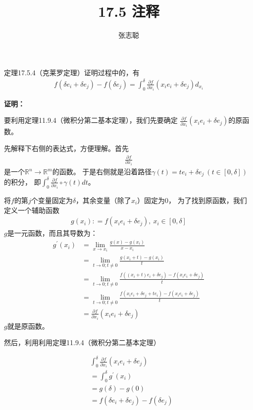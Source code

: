 \documentclass{article}
\begin{document}
\title{17.5 注释}
\author{张志聪}
\maketitle

\begin{zremark}
  定理17.5.4（克莱罗定理）证明过程中的，有
  \begin{align*}
    f(\delta e_i + \delta e_j) - f(\delta e_j)
    = \int_{0}^{\delta} \frac{\partial f}{\partial x_i} (x_ie_i + \delta e_j) d_{x_i}
  \end{align*}
\end{zremark}

\textbf{证明：}

要利用定理11.9.4（微积分第二基本定理），我们先要确定
$\frac{\partial f}{\partial x_i} (x_ie_i + \delta e_j)$的原函数。

先解释下右侧的表达式，方便理解。首先
\begin{align*}
  \frac{\partial f}{\partial x_i}
\end{align*}
是一个$\mathbb{R}^n \to \mathbb{R}^m$的函数。
于是右侧就是沿着路径$\gamma (t) = te_i + \delta e_j \ (t \in [0, \delta])$的积分，
即$\int_{0}^{\delta} \frac{\partial f}{\partial x_i} \circ \gamma (t) dt$。

将$f$的第$j$个变量固定为$\delta$，其余变量（除了$x_i$）固定为$0$，
为了找到原函数，我们定义一个辅助函数
\begin{align*}
  g(x_i) : = f(x_ie_i + \delta e_j), \ x_i \in [0, \delta]
\end{align*}
$g$是一元函数，而且其导数为：
\begin{align*}
  g^\prime(x_i)
   & = \lim \limits_{x \to x_i} \frac{g(x) - g(x_i)}{x - x_i}                                           \\
   & = \lim\limits_{t \to 0;t \neq 0} \frac{g(x_i + t) - g(x_i)}{t}                                     \\
   & = \lim\limits_{t \to 0;t \neq 0} \frac{f((x_i + t)e_i + \delta e_j) - f(x_ie_i + \delta e_j)}{t}   \\
   & = \lim\limits_{t \to 0;t \neq 0} \frac{f(x_i e_i + \delta e_j + te_i) - f(x_ie_i + \delta e_j)}{t} \\
   & = \frac{\partial f}{\partial x_i} (x_i e_i + \delta e_j)
\end{align*}
$g$就是原函数。

然后，利用利用定理11.9.4（微积分第二基本定理）

\begin{align*}
   & \int_{0}^{\delta} \frac{\partial f}{\partial x_i} (x_i e_i + \delta e_j) \\
   & = \int_{0}^{\delta} g^\prime(x_i)                                        \\
   & = g(\delta) - g(0)                                                       \\
   & = f(\delta e_i + \delta e_j) - f(\delta e_j)
\end{align*}
\end{document}
